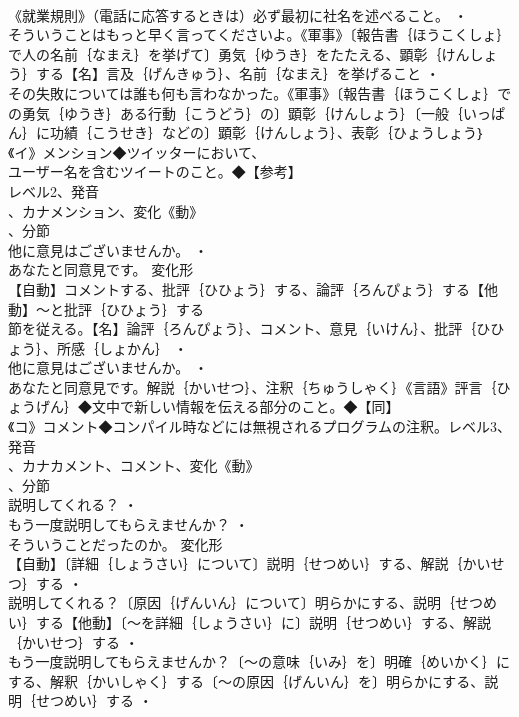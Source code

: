 \documentclass[8pt]{extreport}
\begin{document}
\begin{CJK}{UTF8}{min}
\\	《就業規則》（電話に応答するときは）必ず最初に社名を述べること。 ・
\\	そういうことはもっと早く言ってくださいよ。《軍事》〔報告書｛ほうこくしょ｝で人の名前｛なまえ｝を挙げて〕勇気｛ゆうき｝をたたえる、顕彰｛けんしょう｝する【名】言及｛げんきゅう｝、名前｛なまえ｝を挙げること ・
\\	その失敗については誰も何も言わなかった。《軍事》〔報告書｛ほうこくしょ｝での勇気｛ゆうき｝ある行動｛こうどう｝の〕顕彰｛けんしょう｝〔一般｛いっぱん｝に功績｛こうせき｝などの〕顕彰｛けんしょう｝、表彰｛ひょうしょう｝《イ》メンション◆ツイッターにおいて、
\\	ユーザー名を含むツイートのこと。◆【参考】
\\	レベル2、発音
\\	、カナメンション、変化《動》
\\	、分節
\\	他に意見はございませんか。 ・
\\	あなたと同意見です。	変化形 
\\	【自動】コメントする、批評｛ひひょう｝する、論評｛ろんぴょう｝する【他動】～と批評｛ひひょう｝する
\\	節を従える。【名】論評｛ろんぴょう｝、コメント、意見｛いけん｝、批評｛ひひょう｝、所感｛しょかん｝ ・
\\	他に意見はございませんか。 ・
\\	あなたと同意見です。解説｛かいせつ｝、注釈｛ちゅうしゃく｝《言語》評言｛ひょうげん｝◆文中で新しい情報を伝える部分のこと。◆【同】
\\	《コ》コメント◆コンパイル時などには無視されるプログラムの注釈。レベル3、発音
\\	、カナカメント、コメント、変化《動》
\\	、分節
\\	説明してくれる？ ・
\\	もう一度説明してもらえませんか？ ・
\\	そういうことだったのか。	変化形 
\\	【自動】〔詳細｛しょうさい｝について〕説明｛せつめい｝する、解説｛かいせつ｝する ・
\\	説明してくれる？〔原因｛げんいん｝について〕明らかにする、説明｛せつめい｝する【他動】〔～を詳細｛しょうさい｝に〕説明｛せつめい｝する、解説｛かいせつ｝する ・
\\	もう一度説明してもらえませんか？〔～の意味｛いみ｝を〕明確｛めいかく｝にする、解釈｛かいしゃく｝する〔～の原因｛げんいん｝を〕明らかにする、説明｛せつめい｝する ・

\end{CJK}
\end{document}
